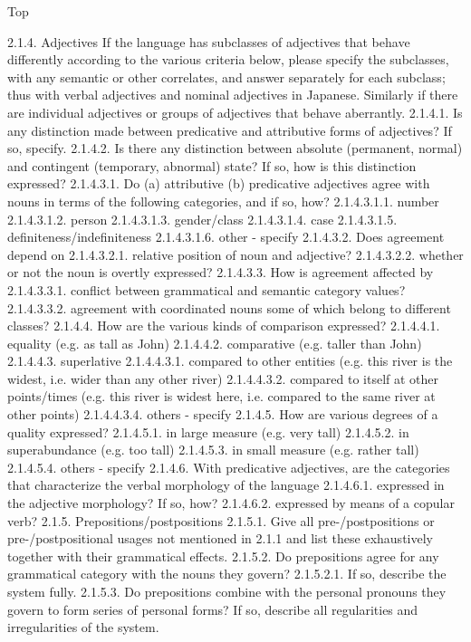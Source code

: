 Top

2.1.4. Adjectives
If the language has subclasses of adjectives that behave differently according to the various criteria below, please specify the subclasses, with any semantic or other correlates, and answer separately for each subclass; thus with verbal adjectives and nominal adjectives in Japanese. Similarly if there are individual adjectives or groups of adjectives that behave aberrantly.
2.1.4.1. Is any distinction made between predicative and attributive forms of adjectives? If so, specify.
2.1.4.2. Is there any distinction between absolute (permanent, normal) and contingent (temporary, abnormal) state? If so, how is this distinction expressed?
2.1.4.3.1. Do (a) attributive (b) predicative adjectives agree with nouns in terms of the following categories, and if so, how?
2.1.4.3.1.1. number
2.1.4.3.1.2. person
2.1.4.3.1.3. gender/class
2.1.4.3.1.4. case
2.1.4.3.1.5. definiteness/indefiniteness
2.1.4.3.1.6. other - specify
2.1.4.3.2. Does agreement depend on
2.1.4.3.2.1. relative position of noun and adjective?
2.1.4.3.2.2. whether or not the noun is overtly expressed?
2.1.4.3.3. How is agreement affected by
2.1.4.3.3.1. conflict between grammatical and semantic category values?
2.1.4.3.3.2. agreement with coordinated nouns some of which belong to different classes?
2.1.4.4. How are the various kinds of comparison expressed?
2.1.4.4.1. equality (e.g. as tall as John)
2.1.4.4.2. comparative (e.g. taller than John)
2.1.4.4.3. superlative
2.1.4.4.3.1. compared to other entities (e.g. this river is the widest, i.e. wider than any other river)
2.1.4.4.3.2. compared to itself at other points/times (e.g. this river is widest here, i.e. compared to the same river at other points)
2.1.4.4.3.4. others - specify
2.1.4.5. How are various degrees of a quality expressed?
2.1.4.5.1. in large measure (e.g. very tall)
2.1.4.5.2. in superabundance (e.g. too tall)
2.1.4.5.3. in small measure (e.g. rather tall)
2.1.4.5.4. others - specify
2.1.4.6. With predicative adjectives, are the categories that characterize the verbal morphology of the language
2.1.4.6.1. expressed in the adjective morphology? If so, how?
2.1.4.6.2. expressed by means of a copular verb?
2.1.5. Prepositions/postpositions
2.1.5.1. Give all pre-/postpositions or pre-/postpositional usages not mentioned in 2.1.1 and list these exhaustively together with their grammatical effects.
2.1.5.2. Do prepositions agree for any grammatical category with the nouns they govern?
2.1.5.2.1. If so, describe the system fully.
2.1.5.3. Do prepositions combine with the personal pronouns they govern to form series of personal forms? If so, describe all regularities and irregularities of the system.
